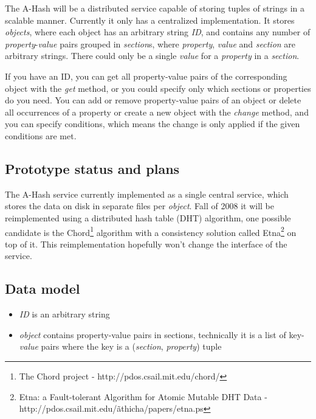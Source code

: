 \documentclass{book}
\begin{document}
The A-Hash will be a distributed service capable of storing tuples of strings in a scalable manner. Currently it only has a centralized implementation. It stores \emph{objects}, where each object has an arbitrary string \emph{ID}, and contains any number of \emph{property}-\emph{value} pairs grouped in \emph{section}s, where \emph{property}, \emph{value} and \emph{section} are arbitrary strings. There could only be a single \emph{value} for a \emph{property} in a \emph{section}.

If you have an ID, you can get all property-value pairs of the corresponding object with the \emph{get} method, or you could specify only which sections or properties do you need. You can add or remove property-value pairs of an object or delete all occurrences of a property or create a new object with the \emph{change} method, and you can specify conditions, which means the change is only applied if the given conditions are met.


\subsection{Prototype status and plans} %

The A-Hash service currently implemented as a single central service, which stores the data on disk in separate files per \emph{object}. Fall of 2008 it will be reimplemented using a distributed hash table (DHT) algorithm, one possible candidate is the Chord\footnote{The Chord project - http://pdos.csail.mit.edu/chord/} algorithm with a consistency solution called Etna\footnote{Etna: a Fault-tolerant Algorithm for Atomic Mutable DHT Data - http://pdos.csail.mit.edu/\~athicha/papers/etna.ps} on top of it. This reimplementation hopefully won’t change the interface of the service.


\subsection{Data model} %

\begin{itemize}
    \item \emph{ID} is an arbitrary string
    \item \emph{object} contains property-value pairs in sections, technically it is a list of key-\emph{value} pairs where the key is a (\emph{section}, \emph{property}) tuple
\end{itemize}
\end{document}
